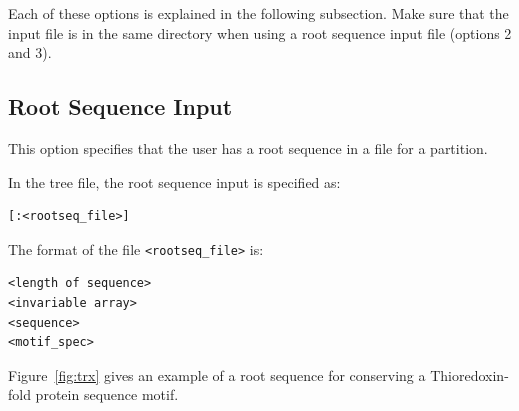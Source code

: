 \documentclass[10pt]{article}
\begin{document}
Each of these options is explained in the following subsection. Make sure that the input file is in the same directory when using a root sequence input file (options 2 and 3).

\subsection{Root Sequence Input}

This option specifies that the user has a root sequence in a file for a partition.  

In the tree file, the root sequence input is specified as:
\begin{verbatim}
[:<rootseq_file>]
\end{verbatim}

The format of the file \verb+<rootseq_file>+ is:
\begin{verbatim}
<length of sequence>
<invariable array>
<sequence>
<motif_spec>
\end{verbatim}

Figure~\ref{fig:trx} gives an example of a root sequence for conserving a Thioredoxin-fold 
protein sequence motif.
\end{document}
